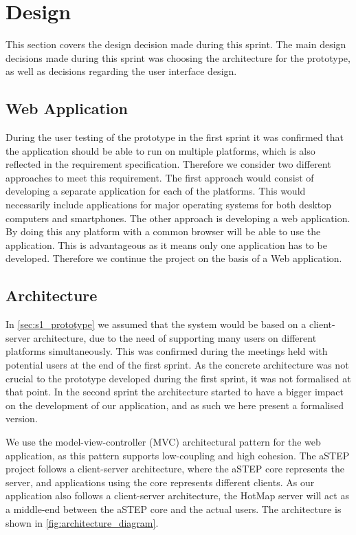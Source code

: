 \section{Design} \label{sec:s2_design}
This section covers the design decision made during this sprint. The main design decisions made during this sprint was choosing the architecture for the prototype, as well as decisions regarding the user interface design.

\subsection{Web Application}
During the user testing of the prototype in the first sprint it was confirmed that the application should be able to run on multiple platforms, which is also reflected in the requirement specification. Therefore we consider two different approaches to meet this requirement. The first approach would consist of developing a separate application for each of the platforms. This would necessarily include applications for major operating systems for both desktop computers and smartphones. The other approach is developing a web application. By doing this any platform with a common browser will be able to use the application. This is advantageous as it means only one application has to be developed. Therefore we continue the project on the basis of a Web application. 

\subsection{Architecture} \label{sec:s2_architecture}
In \cref{sec:s1_prototype} we assumed that the system would be based on a client-server architecture, due to the need of supporting many users on different platforms simultaneously. This was confirmed during the meetings held with potential users at the end of the first sprint. As the concrete architecture was not crucial to the prototype developed during the first sprint, it was not formalised at that point. In the second sprint the architecture started to have a bigger impact on the development of our application, and as such we here present a formalised version.

We use the model-view-controller (MVC)\cite{} architectural pattern for the web application, as this pattern supports low-coupling and high cohesion. The aSTEP project follows a client-server architecture, where the aSTEP core represents the server, and applications using the core represents different clients. As our application also follows a client-server architecture, the HotMap server will act as a middle-end between the aSTEP core and the actual users. The architecture is shown in \cref{fig:architecture_diagram}.

